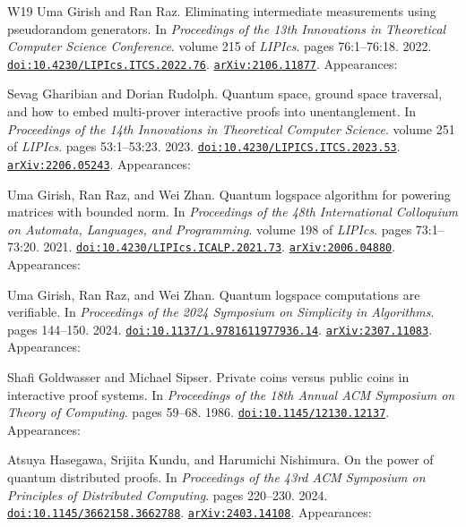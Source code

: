 \documentclass[10pt,a4paper]{article}
\numberwithin{equation}{section}
\numberwithin{figure}{section}
\begin{document}
\begin{thebibliography}{{}W19}
Uma Girish and Ran Raz.
\newblock Eliminating intermediate measurements using pseudorandom generators.
\newblock In {\em Proceedings of the 13th Innovations in Theoretical Computer Science Conference}. volume 215 of {\em LIPIcs}. pages 76:1--76:18. 2022.
\newblock \href {https://doi.org/10.4230/LIPIcs.ITCS.2022.76} {\texttt{doi:10.4230/LIPIcs.ITCS.2022.76}}. \href {https://arxiv.org/abs/2106.11877} {\texttt{arXiv:2106.11877}}. Appearances:\!

Sevag Gharibian and Dorian Rudolph.
\newblock Quantum space, ground space traversal, and how to embed multi-prover interactive proofs into unentanglement.
\newblock In {\em Proceedings of the 14th Innovations in Theoretical Computer Science}. volume 251 of {\em LIPIcs}. pages 53:1--53:23. 2023.
\newblock \href {https://doi.org/10.4230/LIPICS.ITCS.2023.53} {\texttt{doi:10.4230/LIPICS.ITCS.2023.53}}. \href {https://arxiv.org/abs/2206.05243} {\texttt{arXiv:2206.05243}}. Appearances:\!

Uma Girish, Ran Raz, and Wei Zhan.
\newblock Quantum logspace algorithm for powering matrices with bounded norm.
\newblock In {\em Proceedings of the 48th International Colloquium on Automata, Languages, and Programming}. volume 198 of {\em LIPIcs}. pages 73:1--73:20. 2021.
\newblock \href {https://doi.org/10.4230/LIPIcs.ICALP.2021.73} {\texttt{doi:10.4230/LIPIcs.ICALP.2021.73}}. \href {https://arxiv.org/abs/2006.04880} {\texttt{arXiv:2006.04880}}. Appearances:\!

Uma Girish, Ran Raz, and Wei Zhan.
\newblock Quantum logspace computations are verifiable.
\newblock In {\em Proceedings of the 2024 Symposium on Simplicity in Algorithms}. pages 144--150. 2024.
\newblock \href {https://doi.org/10.1137/1.9781611977936.14} {\texttt{doi:10.1137/1.9781611977936.14}}. \href {https://arxiv.org/abs/2307.11083} {\texttt{arXiv:2307.11083}}. Appearances:\!

Shafi Goldwasser and Michael Sipser.
\newblock Private coins versus public coins in interactive proof systems.
\newblock In {\em Proceedings of the 18th Annual ACM Symposium on Theory of Computing}. pages 59--68. 1986.
\newblock \href {https://doi.org/10.1145/12130.12137} {\texttt{doi:10.1145/12130.12137}}. Appearances:\!

Atsuya Hasegawa, Srijita Kundu, and Harumichi Nishimura.
\newblock On the power of quantum distributed proofs.
\newblock In {\em Proceedings of the 43rd ACM Symposium on Principles of Distributed Computing}. pages 220--230. 2024.
\newblock \href {https://doi.org/10.1145/3662158.3662788} {\texttt{doi:10.1145/3662158.3662788}}. \href {https://arxiv.org/abs/2403.14108} {\texttt{arXiv:2403.14108}}. Appearances:\!


\end{thebibliography}
\end{document}
